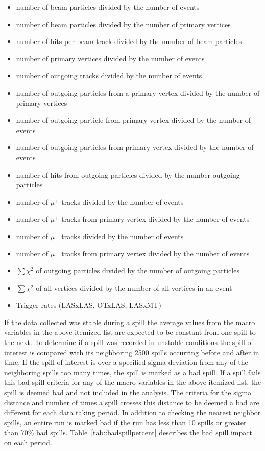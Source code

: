 \begin{itemize}
\item number of beam particles divided by the number of events
\item number of beam particles divided by the number of primary vertices
\item number of hits per beam track divided by the number of beam particles
\item number of primary vertices divided by the number of events
\item number of outgoing tracks divided by the number of events
\item number of outgoing particles from a primary vertex divided by the number
  of primary vertices
\item number of outgoing particle from primary vertex divided by the number of
  events
\item number of outgoing particles from primary vertex divided by the number of
  events
\item number of hits from outgoing particles divided by the number outgoing
  particles
\item number of $\mu^+$ tracks divided by the number of events
\item number of $\mu^+$ tracks from primary vertex divided by the number of
  events
\item number of $\mu^-$ tracks divided by the number of events
\item number of $\mu^-$ tracks from primary vertex divided by the number of
  events
\item $\sum \chi^2$ of outgoing particles divided by the number of outgoing
  particles
\item $\sum \chi^2$ of all vertices divided by the number of all vertices in an
  event
\item Trigger rates (LASxLAS, OTxLAS, LASxMT)
\end{itemize}

If the data collected was stable during a spill the average values from the
macro variables in the above itemized list are expected to be constant from one
spill to the next.  To determine if a spill was recorded in unstable conditions
the spill of interest is compared with its neighboring 2500 spills occurring
before and after in time.  If the spill of interest is over a specified sigma
deviation from any of the neighboring spills too many times, the spill is marked
as a bad spill.  If a spill fails this bad spill criteria for any of the macro
variables in the above itemized list, the spill is deemed bad and not included
in the analysis.  The criteria for the sigma distance and number of times a
spill crosses this distance to be deemed a bad are different for each data
taking period.  In addition to checking the nearest neighbor spills, an entire
run is marked bad if the run has less than 10 spills or greater than 70\% bad
spills.  Table~\ref{tab::badspillpercent} describes the bad spill impact on each
period. \par

